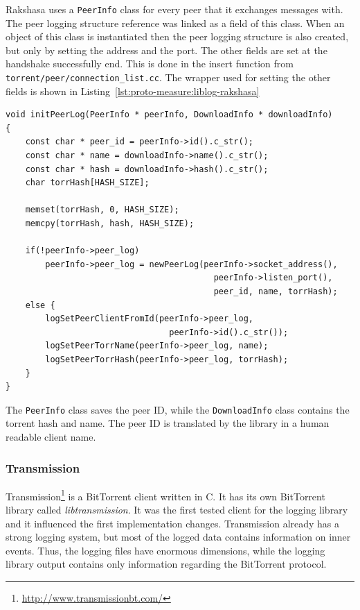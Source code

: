 Rakshasa uses a \texttt{PeerInfo} class for every peer that it exchanges
messages with.  The peer logging structure reference was linked as a field of
this class. When an object of this class is instantiated then the peer logging
structure is also created, but only by setting the address and the port. The
other fields are set at the handshake successfully end. This is done in the
insert function from \texttt{torrent/peer/connection\_list.cc}. The wrapper
used for setting the other fields is shown in
Listing~\ref{lst:proto-measure:liblog-rakshasa}

\lstset{language=C,caption=Library Logging in
libtorrent-rakshasa,label=lst:proto-measure:liblog-rakshasa}
\begin{lstlisting}
void initPeerLog(PeerInfo * peerInfo, DownloadInfo * downloadInfo)
{
    const char * peer_id = peerInfo->id().c_str();
    const char * name = downloadInfo->name().c_str();
    const char * hash = downloadInfo->hash().c_str();
    char torrHash[HASH_SIZE];

    memset(torrHash, 0, HASH_SIZE);
    memcpy(torrHash, hash, HASH_SIZE);

    if(!peerInfo->peer_log)
        peerInfo->peer_log = newPeerLog(peerInfo->socket_address(),
                                          peerInfo->listen_port(),
                                          peer_id, name, torrHash);
    else {
        logSetPeerClientFromId(peerInfo->peer_log,
                                 peerInfo->id().c_str());
        logSetPeerTorrName(peerInfo->peer_log, name);
        logSetPeerTorrHash(peerInfo->peer_log, torrHash);
    }
}
\end{lstlisting}

The \texttt{PeerInfo} class saves the peer ID, while the \texttt{DownloadInfo}
class contains the torrent hash and name. The peer ID is translated by the
library in a human readable client name.

\subsubsection{Transmission}

Transmission\footnote{\url{http://www.transmissionbt.com/}} is a BitTorrent client
written in C. It has its own BitTorrent library called
\textit{libtransmission}. It was the first tested client for the logging
library and it influenced the first implementation changes. Transmission
already has a strong logging system, but most of the logged data contains
information on inner events. Thus, the logging files have enormous dimensions,
while the logging library output contains only information regarding the
BitTorrent protocol.

